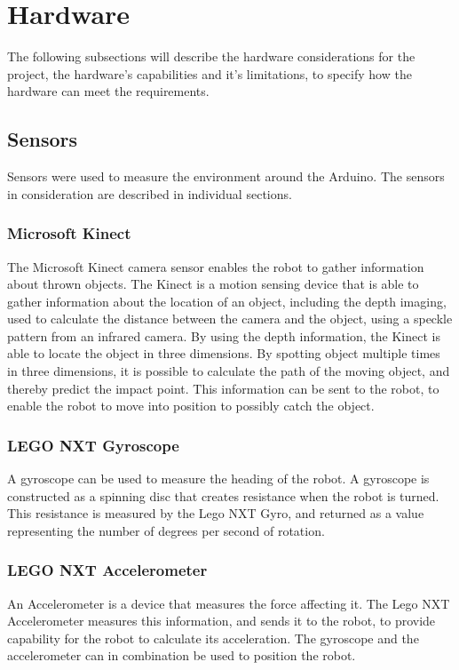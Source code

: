 \section{Hardware}
\label{sec:Hardware} 
The following subsections will describe the hardware considerations for the project, the hardware’s capabilities and it’s limitations, to specify how the hardware can meet the requirements.

\subsection{Sensors}
\label{sec:Sensors}
Sensors were used to measure the environment around the Arduino. The sensors in consideration are described in individual sections. 

\subsubsection{Microsoft Kinect}
\label{sec:Microsoft Kinect}
The Microsoft Kinect camera sensor enables the robot to gather information about thrown objects. The Kinect is a motion sensing device that is able to gather information about the location of an object, including the depth imaging, used to calculate the distance between the camera and the object, using a speckle pattern from an infrared camera. By using the depth information, the Kinect is able to locate the object in three dimensions.
By spotting object multiple times in three dimensions, it is possible to calculate the path of the moving object, and thereby predict the impact point. This information can be sent to the robot, to enable the robot to move into position to possibly catch the object.

\subsubsection{LEGO NXT Gyroscope}
\label{sec:LEGO NXT Gyroscope}
A gyroscope can be used to measure the heading of the robot. A gyroscope is constructed as a spinning disc that creates resistance when the robot is turned. This resistance is measured by the Lego NXT Gyro, and returned as a value representing the number of degrees per second of rotation.

\subsubsection{LEGO NXT Accelerometer}
\label{sec:LEGO NXT Accelerometer}
An Accelerometer is a device that measures the force affecting it. The Lego NXT Accelerometer measures this information, and sends it to the robot, to provide capability for the robot to calculate its acceleration. The gyroscope and the accelerometer can in combination be used to position the robot. 

